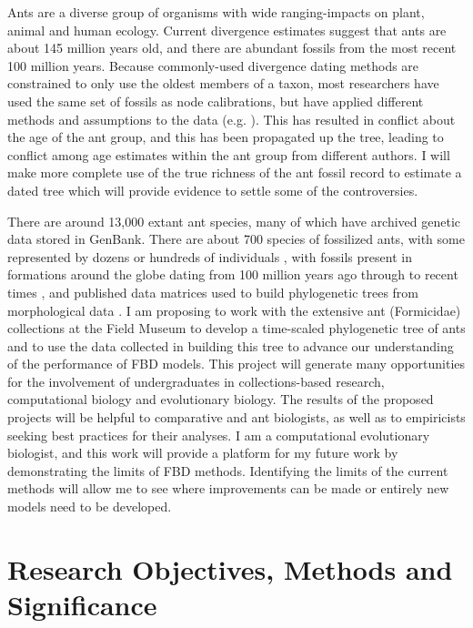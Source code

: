 \documentclass[]{article}
\begin{document}
Ants are a diverse group of organisms with wide ranging-impacts on plant, animal and human ecology. Current divergence estimates suggest that ants are about 145 million years old, and there are abundant fossils from the most recent 100 million years. Because commonly-used divergence dating methods are constrained to only use the oldest members of a taxon, most researchers have used the same set of fossils as node calibrations, but have applied different methods and assumptions to the data (e.g. \citep{brady2006evaluating, moreau2013testing, ward2014}). This has resulted in conflict about the age of the ant group, and this has been propagated up the tree, leading to conflict among age estimates within the ant group from different authors. I will make more complete use of the true richness of the ant fossil record to estimate a dated tree which will provide evidence to settle some of the controversies. \par
There are around 13,000 extant ant species, many of which have archived genetic data stored in GenBank. There are about 700 species of fossilized ants, with some represented by dozens or hundreds of individuals \citep{ref87}, with fossils present in formations around the globe dating from 100 million years ago through to recent times \citep{ref87}, and published data matrices used to build phylogenetic trees from morphological data \citep{urbani1992internal, grimaldi1997new, brady2005morphological}. I am proposing to work with the extensive ant (Formicidae) collections at the Field Museum to develop a time-scaled phylogenetic tree of ants and to use the data collected in building this tree to advance our understanding of the performance of FBD models. This project will generate many opportunities for the involvement of undergraduates in collections-based research, computational biology and evolutionary biology. The results of the proposed projects will be helpful to comparative and ant biologists, as well as to empiricists seeking best practices for their analyses. I am a computational evolutionary biologist, and this work will provide a platform for my future work by demonstrating the limits of FBD methods. Identifying the limits of the current methods will allow me to see where improvements can be made or entirely new models need to be developed. \par


\section*{Research Objectives, Methods and Significance}
\end{document}
